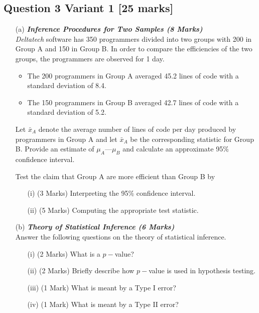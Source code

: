 \documentclass[]{article}
\begin{document}
\subsection*{Question 3 Variant 1 [25 marks]}



\begin{itemize}
\item[(a)] \textbf{\textit{Inference Procedures for Two Samples (8 Marks)}}\\

\textit{Deltatech} software has 350 programmers divided into two groups with 200 in Group A
and 150 in Group B. In order to compare the efficiencies of the two groups, the
programmers are observed for 1 day.
\begin{itemize}
\item The 200 programmers in Group A averaged 45.2 lines of code with a standard
deviation of 8.4.
\item The 150 programmers in Group B averaged 42.7 lines of code with a standard
deviation of 5.2.
\end{itemize}
Let $\bar{x}_A$ denote the average number of lines of code per day produced by programmers in
Group A and
let $\bar{x}_A$ be the corresponding statistic for Group B.
Provide an estimate of $\mu_A —\mu_B$ and calculate an approximate 95\% confidence interval.

Test the claim that Group A are more efficient than Group B by
\begin{itemize}
\item[(i)](3 Marks) Interpreting the 95\% confidence interval.
\item[(ii)](5 Marks) Computing the appropriate test statistic.
\end{itemize}

\item[(b)] \textbf{\textit{Theory of Statistical Inference (6 Marks)}}\\Answer the following questions on the theory of statistical inference.
\begin{itemize}
\item[(i)] (2 Marks) What is a $p-$value?
\item[(ii)] (2 Marks) Briefly describe how $p-$value is used in hypothesis testing.
\item[(iii)] (1 Mark) What is meant by a Type I error?
\item[(iv)] (1 Mark) What is meant by a Type II error?
\end{itemize}
\bigskip


\end{itemize}
\end{document}
